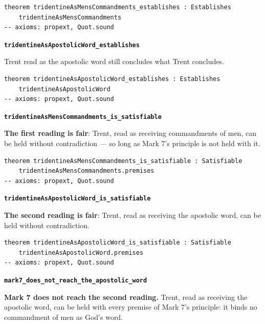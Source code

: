 \documentclass[11pt]{article}
\begin{document}
{\small\begin{verbatim}
theorem tridentineAsMensCommandments_establishes : Establishes
    tridentineAsMensCommandments
-- axioms: propext, Quot.sound
\end{verbatim}}
\par\medskip\noindent\textbf{\texttt{tridentine\allowbreak{}As\allowbreak{}Apostolic\allowbreak{}Word\_\allowbreak{}establishes}}\par\nobreak\noindent
Trent read as the apostolic word still concludes what Trent concludes.

{\small\begin{verbatim}
theorem tridentineAsApostolicWord_establishes : Establishes
    tridentineAsApostolicWord
-- axioms: propext, Quot.sound
\end{verbatim}}
\par\medskip\noindent\textbf{\texttt{tridentine\allowbreak{}As\allowbreak{}Mens\allowbreak{}Commandments\_\allowbreak{}is\_\allowbreak{}satisfiable}}\par\nobreak\noindent
\textbf{The first reading is fair}: Trent, read as receiving commandments of men, can be held without contradiction — so long as Mark 7’s principle is not held with it.

{\small\begin{verbatim}
theorem tridentineAsMensCommandments_is_satisfiable : Satisfiable
    tridentineAsMensCommandments.premises
-- axioms: propext, Quot.sound
\end{verbatim}}
\par\medskip\noindent\textbf{\texttt{tridentine\allowbreak{}As\allowbreak{}Apostolic\allowbreak{}Word\_\allowbreak{}is\_\allowbreak{}satisfiable}}\par\nobreak\noindent
\textbf{The second reading is fair}: Trent, read as receiving the apostolic word, can be held without contradiction.

{\small\begin{verbatim}
theorem tridentineAsApostolicWord_is_satisfiable : Satisfiable
    tridentineAsApostolicWord.premises
-- axioms: propext, Quot.sound
\end{verbatim}}
\par\medskip\noindent\textbf{\texttt{mark7\_\allowbreak{}does\_\allowbreak{}not\_\allowbreak{}reach\_\allowbreak{}the\_\allowbreak{}apostolic\_\allowbreak{}word}}\par\nobreak\noindent
\textbf{Mark 7 does not reach the second reading.} Trent, read as receiving the apostolic word, can be held with every premise of Mark 7’s principle: it binds no commandment of men as God’s word.
\end{document}
